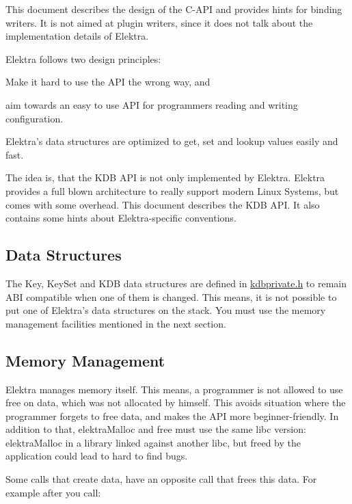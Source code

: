 This document describes the design of the C-\/\+A\+PI and provides hints for binding writers. It is not aimed at plugin writers, since it does not talk about the implementation details of Elektra.

Elektra follows two design principles\+:


\begin{DoxyEnumerate}
\item Make it hard to use the A\+PI the wrong way, and
\item aim towards an easy to use A\+PI for programmers reading and writing configuration.
\end{DoxyEnumerate}

Elektra’s data structures are optimized to get, set and lookup values easily and fast.

The idea is, that the K\+DB A\+PI is not only implemented by Elektra. Elektra provides a full blown architecture to really support modern Linux Systems, but comes with some overhead. This document describes the {\ttfamily K\+DB} A\+PI. It also contains some hints about Elektra-\/specific conventions.

\subsection*{Data Structures}

The {\ttfamily Key}, {\ttfamily Key\+Set} and {\ttfamily K\+DB} data structures are defined in {\ttfamily \hyperlink{kdbprivate_8h}{kdbprivate.\+h}} to remain A\+BI compatible when one of them is changed. This means, it is not possible to put one of Elektra’s data structures on the stack. You must use the memory management facilities mentioned in the next section.

\subsection*{Memory Management}

Elektra manages memory itself. This means, a programmer is not allowed to use free on data, which was not allocated by himself. This avoids situation where the programmer forgets to free data, and makes the A\+PI more beginner-\/friendly. In addition to that, {\ttfamily elektra\+Malloc} and {\ttfamily free} must use the same libc version\+: {\ttfamily elektra\+Malloc} in a library linked against another libc, but freed by the application could lead to hard to find bugs.

Some calls that create data, have an opposite call that frees this data. For example after you call\+:



